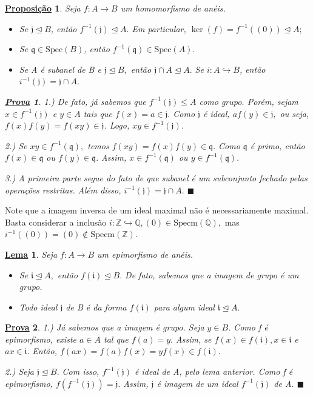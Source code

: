 \documentclass{article}
\newtheorem*{lemma*}{\underline{Lema}}
\newtheorem*{prop*}{\underline{Proposi\c c\~ao}}
\newtheorem*{proof*}{\underline{Prova}}
\renewcommand\qedsymbol{$\blacksquare$}
\begin{document}
\begin{prop*}
  Seja \(f:A\rightarrow B\) um homomorfismo de anéis.
\begin{itemize}
  \item[1)] Se \(\mathfrak{j}\trianglelefteq{B}\), então \(f^{-1}(\mathfrak{j})\trianglelefteq{A}.\) Em particular, \(\ker{(f)} = f^{-1}((0))\trianglelefteq{A};\)
  \item[2)] Se \(\mathfrak{q}\in \mathrm{Spec}(B)\), então \(f^{-1}(\mathfrak{q})\in \mathrm{Spec}(A).\)
  \item[3)] Se A é subanel de B e \(\mathfrak{j}\trianglelefteq{B},\) então \(\mathfrak{j}\cap A \trianglelefteq{A}.\) Se \(i:A\hookrightarrow B\),
então \(i^{-1}(\mathfrak{j})=\mathfrak{j}\cap A.\)
\end{itemize}
\begin{proof*}
  1.) De fato, já sabemos que \(f^{-1}(\mathfrak{j})\leq A\) como grupo. Porém, sejam \(x\in f^{-1}(\mathfrak{j})\)
e \(y\in A\) tais que \(f(x) = a\in \mathfrak{j}.\) Como \(\mathfrak{j}\) é ideal, \(af(y)\in \mathfrak{j},\)
ou seja, \(f(x)f(y) = f(xy)\in \mathfrak{j}\). Logo, \(xy\in f^{-1}(\mathfrak{j})\).

  2.) Se \(xy\in f^{-1}(\mathfrak{q}),\) temos \(f(xy) = f(x)f(y)\in \mathfrak{q}.\) Como \(\mathfrak{q}\) é primo, 
então \(f(x)\in \mathfrak{q}\) ou \(f(y)\in \mathfrak{q}.\) Assim, \(x\in f^{-1}(\mathfrak{q})\) ou \(y\in f^{-1}(\mathfrak{q}).\)

  3.) A primeira parte segue do fato de que subanel é um subconjunto fechado pelas operações restritas. Além disso,
 \(i^{-1}(\mathfrak{j}) = \mathfrak{j}\cap A.\) \qedsymbol
\end{proof*}
\end{prop*}
  Note que a imagem inversa de um ideal maximal não é necessariamente maximal.
Basta considerar a inclusão \(i:\mathbb{Z}\hookrightarrow \mathbb{Q}, (0)\in \mathrm{Specm}(\mathbb{Q}),\)
mas \(i^{-1}((0)) = (0)\not\in \mathrm{Specm}(\mathbb{Z}).\)
\begin{lemma*}
  Seja \(f:A\rightarrow B\) um epimorfismo de anéis.
\begin{itemize}
  \item[1)] Se \(\mathfrak{i}\trianglelefteq{A},\) então \(f(\mathfrak{i})\trianglelefteq{B}.\) De fato, sabemos que a imagem
de grupo é um grupo.
  \item[2)] Todo ideal \(\mathfrak{j}\) de B é da forma \(f(\mathfrak{i})\) para algum ideal \(\mathfrak{i}\trianglelefteq{A}.\)
\end{itemize}
\end{lemma*}
\begin{proof*}
  1.) Já sabemos que a imagem é grupo. Seja \(y\in B.\) Como f é epimorfismo, existe
 \(a\in A\) tal que \(f(a) = y.\) Assim, se \(f(x)\in f(\mathfrak{i}), x\in \mathfrak{i}\) e 
 \(ax\in \mathfrak{i}.\) Então, \(f(ax) = f(a)f(x) = y f(x)\in f(\mathfrak{i}).\)

  2.) Seja \(\mathfrak{j}\trianglelefteq{B}.\) Com isso, \(f^{-1}(\mathfrak{j})\) é ideal de A, pelo lema anterior.
Como f é epimorfismo, \(f(f^{-1}(\mathfrak{j})) = \mathfrak{j}.\) Assim, \(\mathfrak{j}\) é imagem de um ideal
 \(f^{-1}(\mathfrak{j})\) de A. \qedsymbol
\end{proof*}
\newpage
\end{document}
